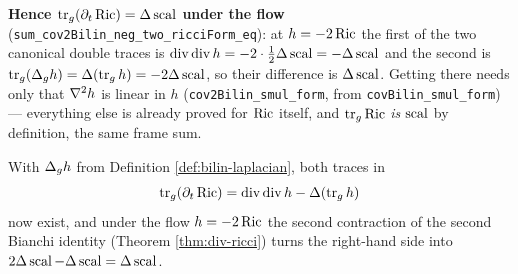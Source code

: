 \begin{definition}
  \textbf{Hence $\operatorname{tr}_g(\partial_t\operatorname{Ric}) = \Delta\operatorname{scal}$ under the
  flow} (\texttt{sum\_cov2Bilin\_neg\_two\_ricciForm\_eq}): at $h = -2\operatorname{Ric}$ the
  first of the two canonical double traces is
  $\operatorname{div}\operatorname{div} h = -2\cdot\tfrac12\Delta\operatorname{scal} =
  -\Delta\operatorname{scal}$ and the second is
  $\operatorname{tr}_g(\Delta_g h) = \Delta(\operatorname{tr}_g h) =
  -2\Delta\operatorname{scal}$, so their difference is $\Delta\operatorname{scal}$. Getting there needs
  only that $\nabla^2h$ is linear in $h$
  (\texttt{cov2Bilin\_smul\_form}, from \texttt{covBilin\_smul\_form}) ---
  everything else is already proved for $\operatorname{Ric}$ itself, and
  $\operatorname{tr}_g\operatorname{Ric}$ \emph{is} $\operatorname{scal}$ by definition, the same frame
  sum.

  With $\Delta_g h$ from Definition \ref{def:bilin-laplacian}, both traces in
  \[
    \operatorname{tr}_g(\partial_t \operatorname{Ric})
      = \operatorname{div}\operatorname{div} h - \Delta(\operatorname{tr}_g h)
  \]
  now exist, and under the flow $h = -2\operatorname{Ric}$ the second contraction of the
  second Bianchi identity (Theorem \ref{thm:div-ricci}) turns the right-hand
  side into $2\Delta\operatorname{scal} - \Delta\operatorname{scal} = \Delta\operatorname{scal}$.
\end{definition}

